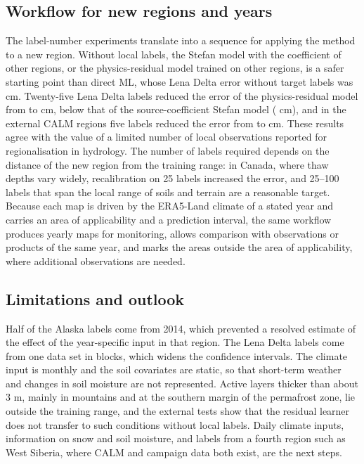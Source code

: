 \subsection{Workflow for new regions and years}
The label-number experiments translate into a sequence for applying the method to a new region. Without local labels, the Stefan model with the coefficient of other regions, or the physics-residual model trained on other regions, is a safer starting point than direct ML, whose Lena Delta error without target labels was \ntlrmseLeDszero{} cm. Twenty-five Lena Delta labels reduced the error of the physics-residual model from \ntlrmseLeRszero{} to \ntlrmseLeRstwfive{} cm, below that of the source-coefficient Stefan model (\ntlrmseLePzzero{} cm), and in the external CALM regions five labels reduced the error from \nftAllRszero{} to \nftAllRsfive{} cm. These results agree with the value of a limited number of local observations reported for regionalisation in hydrology\cite{Pool2019}. The number of labels required depends on the distance of the new region from the training range: in Canada, where thaw depths vary widely, recalibration on 25 labels increased the error, and 25--100 labels that span the local range of soils and terrain are a reasonable target. Because each map is driven by the ERA5-Land climate of a stated year and carries an area of applicability and a prediction interval, the same workflow produces yearly maps for monitoring, allows comparison with observations or products of the same year, and marks the areas outside the area of applicability, where additional observations are needed.

\subsection{Limitations and outlook}
Half of the Alaska labels come from 2014, which prevented a resolved estimate of the effect of the year-specific input in that region. The Lena Delta labels come from one data set in \nnblkLe{} blocks, which widens the confidence intervals. The climate input is monthly and the soil covariates are static, so that short-term weather and changes in soil moisture are not represented. Active layers thicker than about 3 m, mainly in mountains and at the southern margin of the permafrost zone, lie outside the training range, and the external tests show that the residual learner does not transfer to such conditions without local labels. Daily climate inputs, information on snow and soil moisture, and labels from a fourth region such as West Siberia, where CALM and campaign data both exist, are the next steps.
